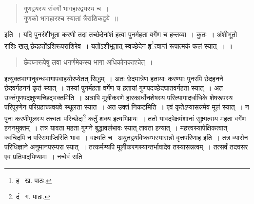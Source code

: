\documentclass[11pt, openany]{book}
\begin{document}
{\begin{quote}
{\qt गुणद्वयस्य संवर्गो भागहारद्वयस्य च~।\\
गुणको भागहारश्च स्यातां त्रैराशिकद्वये~॥}
\end{quote}

\noindent इति~। यदि पुनरंशीभूता करणी तदा तच्छेदेनांशं हत्वा पुनर्महता वर्गेण च हन्तव्या~। कुतः~। अंशीभूतो राशिः खलु छेदहतोंऽशिरूपराशिरेव~। यतोंऽशीभूतात् स्वच्छेदेन हृ\renewcommand{\thefootnote}{१}\footnote{ह \textendash\ ख. पाठः.}त्वाप्तं रूपात्मकं फलं स्यात्~।~। 

\begin{quote}
{\qt छेदघ्नरूपेषु लवा धनर्णमेकस्य भागा अधिकोनकाश्चेत्~।}
\end{quote}

\noindent इत्युक्तभागानुबन्धभागापवाहयोरप्येतत् सिद्धम्~। अतः छेदमात्रेण हतायाः करण्याः पुनरपि छेदहनने छेदवर्गहननं कृतं स्यात्~। तस्यां पुनर्महता वर्गेण च हतायां गुणपदच्छेदघातवर्गहता स्यात्~। अत उक्तं{\qt गुणपदक्षुण्णच्छिद्भक्त}मिति~। अत्रापि मूलीकरणे हारकार्धोनशेषस्य परित्यागादर्धाधिके शेषरूपस्य परिपूरणेन परिग्रहाच्चवयवे स्थूलता स्यात~। अत उक्तं निकटमिति~। एवं कृतेऽप्यासन्नमेव मूलं स्यात्~। न पुनः करणीमूलस्य तत्त्वतः परिच्छेदः\renewcommand{\thefootnote}{२}\footnote{दं \textendash\ ग. पाठः.} कर्तुं शक्य इत्यभिप्रायः~। ततो यावदपेक्षमंशानां सूक्ष्मत्वाय महता वर्गेण हननमुक्तम्~। तत्र यावता महता गुणने बुद्धावलंभावः स्यात् तावता हन्यात्~। महत्त्वस्यापेक्षिकत्वात् क्वचिदपि न परिसमाप्तिरिति भावः~। वक्ष्यति च \textendash\ {\qt अयुतद्वयविष्कम्भस्यासन्नो वृत्तपरिणाह} इति~। तत्र व्यासेन परिधिज्ञाने अनुमानपरम्परा स्यात्~। तत्कर्मण्यपि मूलीकरणस्यान्तर्भावादेव तस्यासन्नत्वम्~। तत्सर्वं तदवसर एव प्रतिपादयिष्यामः~। नन्वेवं सति

\newpage

}
\end{document}
